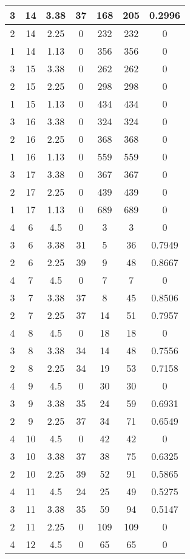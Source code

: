 \documentclass[letterpaper, 12pt]{article}
\begin{document}
\begin{longtable}{|c|c|c|c|c|c|c|}
\hline
3 & 14 & 3.38 & 37 & 168 & 205 & 0.2996 \\
\hline
2 & 14 & 2.25 & 0 & 232 & 232 & 0 \\
\hline
1 & 14 & 1.13 & 0 & 356 & 356 & 0 \\
\hline
3 & 15 & 3.38 & 0 & 262 & 262 & 0 \\
\hline
2 & 15 & 2.25 & 0 & 298 & 298 & 0 \\
\hline
1 & 15 & 1.13 & 0 & 434 & 434 & 0 \\
\hline
3 & 16 & 3.38 & 0 & 324 & 324 & 0 \\
\hline
2 & 16 & 2.25 & 0 & 368 & 368 & 0 \\
\hline
1 & 16 & 1.13 & 0 & 559 & 559 & 0 \\
\hline
3 & 17 & 3.38 & 0 & 367 & 367 & 0 \\
\hline
2 & 17 & 2.25 & 0 & 439 & 439 & 0 \\
\hline
1 & 17 & 1.13 & 0 & 689 & 689 & 0 \\
\hline
4 & 6 & 4.5 & 0 & 3 & 3 & 0 \\
\hline
3 & 6 & 3.38 & 31 & 5 & 36 & 0.7949 \\
\hline
2 & 6 & 2.25 & 39 & 9 & 48 & 0.8667 \\
\hline
4 & 7 & 4.5 & 0 & 7 & 7 & 0 \\
\hline
3 & 7 & 3.38 & 37 & 8 & 45 & 0.8506 \\
\hline
2 & 7 & 2.25 & 37 & 14 & 51 & 0.7957 \\
\hline
4 & 8 & 4.5 & 0 & 18 & 18 & 0 \\
\hline
3 & 8 & 3.38 & 34 & 14 & 48 & 0.7556 \\
\hline
2 & 8 & 2.25 & 34 & 19 & 53 & 0.7158 \\
\hline
4 & 9 & 4.5 & 0 & 30 & 30 & 0 \\
\hline
3 & 9 & 3.38 & 35 & 24 & 59 & 0.6931 \\
\hline
2 & 9 & 2.25 & 37 & 34 & 71 & 0.6549 \\
\hline
4 & 10 & 4.5 & 0 & 42 & 42 & 0 \\
\hline
3 & 10 & 3.38 & 37 & 38 & 75 & 0.6325 \\
\hline
2 & 10 & 2.25 & 39 & 52 & 91 & 0.5865 \\
\hline
4 & 11 & 4.5 & 24 & 25 & 49 & 0.5275 \\
\hline
3 & 11 & 3.38 & 35 & 59 & 94 & 0.5147 \\
\hline
2 & 11 & 2.25 & 0 & 109 & 109 & 0 \\
\hline
4 & 12 & 4.5 & 0 & 65 & 65 & 0 \\

\end{longtable}
\end{document}
